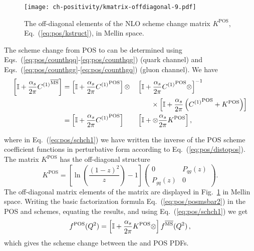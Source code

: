 \begin{figure}[t]
  \begin{center}
    \texttt{[image: ch-positivity/kmatrix-offdiagonal-9.pdf]}
    \caption{\small The off-diagonal  elements of the NLO scheme
      change matrix $K^{\textrm{POS}}$, Eq.~(\ref{eq:pos/kstruct}), in Mellin space.
    \label{fig:kmat} }
  \end{center}
\end{figure}
The scheme change from
POS to \msbar{} can be determined using Eqs.~(\ref{eq:pos/counthqq}-\ref{eq:pos/counthqg}) (quark channel)
and Eqs.~(\ref{eq:pos/counthgg}-\ref{eq:pos/counthgq}) (gluon channel).
We have
\begin{alignat}{2}
  \label{eq:pos/schch0}
\left[\mathbb{I}
+\frac{\alpha_s}{2\pi} {C^{(1)}}^{{\overline{\textrm{MS}}}}\right]&=
  \left[\mathbb{I} +\frac{\alpha_s}{2\pi} {C^{(1)}}^{\textrm{POS}}\right]\otimes
  &&\left[\mathbb{I} + \frac{\alpha_s}{2\pi} {C^{(1)}}^{\textrm{POS}}\otimes\right]^{-1}
  \nonumber\\
  & &&\qquad\times\left[\mathbb{I} +\frac{\alpha_s}{2\pi}  
    \left({C^{(1)}}^{\textrm{POS}} + K^{\textrm{POS}} \right)
  \right]\\
&=\left[\mathbb{I}
  +\frac{\alpha_s}{2\pi} {C^{(1)}}^{\textrm{POS}}
  \right]
  &&\left[\mathbb{I} + \otimes \frac{\alpha_s}{2\pi}  K^{\textrm{POS}}\right]
  , \label{eq:pos/schch1}
\end{alignat}

where in Eq.~(\ref{eq:pos/schch1}) we have written the inverse of the
POS scheme coefficient functions in perturbative form according to
Eq.~(\ref{eq:pos/distopos}). The matrix  $K^{\textrm{POS}}$ has the
off-diagonal structure
\begin{equation}\label{eq:pos/kstruct}
  K^{\textrm{POS}}=\left[\ln\left(\frac{(1-z)^2}{z}\right) - 1\right]
  \left(\begin{array}{cc} 0 & P_{qg}(z) \\
  P_{gq}(z) & 0\end{array}\right).
\end{equation}
The off-diagonal matrix elements of the matrix are displayed in
Fig.~\ref{fig:kmat} in Mellin space. 
Writing the basic factorization formula Eq.~(\ref{eq:pos/posmsbar2}) in
the POS and \msbar{} schemes, equating the results, and using
Eq.~(\ref{eq:pos/schch1}) we get
\begin{align}
  \label{eq:pos/schch}
 f^{\textrm{POS}}(Q^2)=\left[\mathbb{I}
  +\frac{\alpha_s}{2\pi}  K^{\textrm{POS}}\otimes\right] f^{{\overline{\textrm{MS}}}}(Q^2)\,,
\end{align}
which gives the scheme change between the \msbar{} and POS PDFs. 

